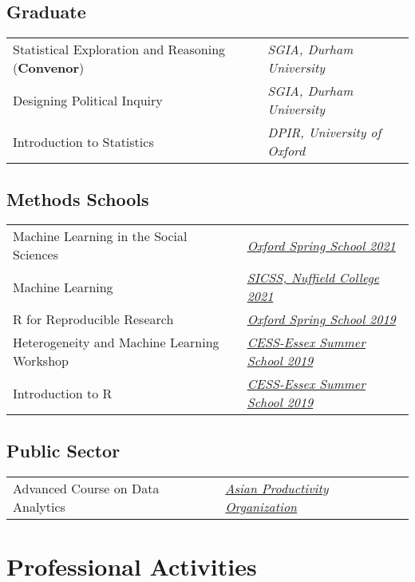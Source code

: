 \documentclass[11pt, a4paper]{article}
\begin{document}
  \subsection*{Graduate}
  \begin{tabular}{p{}p{}}
      Statistical Exploration and Reasoning (\textbf{Convenor}) & \textit{SGIA, Durham University} \\
      Designing Political Inquiry & \textit{SGIA, Durham University} \\
      Introduction to Statistics & \textit{DPIR, University of Oxford} \\
  \end{tabular}

  \subsection*{Methods Schools}
  \begin{tabular}{p{}p{}}
      Machine Learning in the Social Sciences & \textit{\href{https://www.politics.ox.ac.uk/spring-school/spring-school.html}{Oxford Spring School 2021}} \\
      Machine Learning & \textit{\href{https://sicss.io/2021/oxford/}{SICSS, Nuffield College 2021}} \\
      R for Reproducible Research & \textit{\href{https://www.politics.ox.ac.uk/spring-school/spring-school.html}{Oxford Spring School 2019}} \\
      Heterogeneity and Machine Learning Workshop & \textit{\href{https://cess-nuffield.nuff.ox.ac.uk/2019-cess-essex-summer-school/}{CESS-Essex Summer School 2019}} \\
      Introduction to R & \textit{\href{https://cess-nuffield.nuff.ox.ac.uk/2019-cess-essex-summer-school/}{CESS-Essex Summer School 2019}} \\
  \end{tabular}

  \subsection*{Public Sector}
 \begin{tabular}{p{}p{}}
      Advanced Course on Data Analytics & \textit{\href{https://www.apo-tokyo.org/}{Asian Productivity Organization}} \\
 \end{tabular}

 \section*{Professional Activities}
\end{document}
